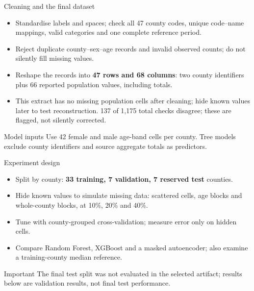 \documentclass[aspectratio=169,11pt]{beamer}
\begin{document}
\begin{frame}{Cleaning and the final dataset}
  \begin{itemize}
    \item Standardise labels and spaces; check all 47 county codes, unique
    code--name mappings, valid categories and one complete reference period.
    \item Reject duplicate county--sex--age records and invalid observed counts;
    do not silently fill missing values.
    \item Reshape the records into \textbf{47 rows and 68 columns}: two county
    identifiers plus 66 reported population values, including totals.
    \item This extract has no missing population cells after cleaning; hide known
    values later to test reconstruction. 137 of 1,175 total checks disagree;
    these are flagged, not silently corrected.
  \end{itemize}
  \begin{block}{Model inputs}
    Use 42 female and male age-band cells per county. Tree models exclude
    county identifiers and source aggregate totals as predictors.
  \end{block}
\end{frame}

\begin{frame}{Experiment design}
  \begin{itemize}
    \item Split by county: \textbf{33 training, 7 validation, 7 reserved test} counties.
    \item Hide known values to simulate missing data: scattered cells, age blocks and
    whole-county blocks, at 10\%, 20\% and 40\%.
    \item Tune with county-grouped cross-validation; measure error only on hidden cells.
    \item Compare Random Forest, XGBoost and a masked autoencoder; also examine a
    training-county median reference.
  \end{itemize}
  \begin{alertblock}{Important}
    The final test split was not evaluated in the selected artifact; results below are
    validation results, not final test performance.
  \end{alertblock}
\end{frame}
\end{document}
